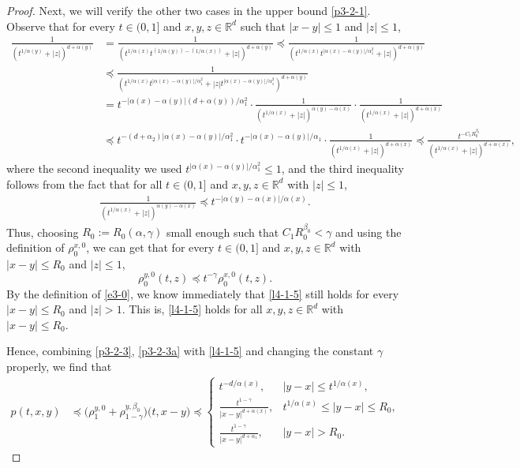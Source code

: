 \documentclass[a4paper,11pt]{amsart}
\renewcommand{\le}{\leqslant}
\newcommand{\R}{\mathds R}
\newcommand{\B}{\beta}
\newcommand{\p}{\preceq}
\newcommand{\A}{\alpha}
\newcommand{\G}{\gamma}
\theoremstyle{definition}
\begin{document}
\begin{proof}
Next, we will verify the other two cases in the upper bound \eqref{p3-2-1}. Observe that
for every $t \in (0,1]$ and $x,y,z\in \R^d$ such that
$|x-y|\le 1$ and $|z|\le 1$,
\begin{align*}
 \frac{1}{(t^{{1/\A(y)}}+|z|)^{d+\A(y)}}
&=
\frac{1}{(t^{{1/\A(x)}}t^{({1/\A(y)})-({1/\A(x)})}+|z|)^{d+\A(y)}}
 \p \frac{1}{(t^{{1/\A(x)}}t^{{|\A(x)-\A(y)|}/{\A_1^2}}+|z|)^{d+\A(y)}}\\
&\p \frac{1}{(t^{{1/\A(x)}}t^{{|\A(x)-\A(y)|}/{\A_1^2}}+|z|t^{{|\A(x)-\A(y)|}/{\A_1^2}})^{d+\A(y)}}\\
&=t^{-{|\A(x)-\A(y)|(d+\A(y))}/{\A_1^2}}\cdot\frac{1}{(t^{{1/\A(x)}}+|z|)^{\A(y)-\A(x)}}\cdot
\frac{1}{(t^{{1/\A(x)}}+|z|)^{d+\A(x)}}\\
&\p t^{-{(d+\A_2)|\A(x)-\A(y)|}/{\A_1^2}}\cdot
t^{-{|\A(x)-\A(y)|}/{\A_1}}\cdot
\frac{1}{(t^{{1/\A(x)}}+|z|)^{d+\A(x)}} \p
\frac{t^{-C_1R_0^{\B_0}}}{(t^{{1/\A(x)}}+|z|)^{d+\A(x)}},
\end{align*}
where the second inequality we used
$t^{{|\A(x)-\A(y)|}/{\A_1^2}}\le 1$, and the third inequality follows from the fact that for all $t\in (0,1]$ and $x,y,z\in \R^d$ with $|z|\le 1$,
\begin{align*}
\frac{1}{(t^{{1/\A(x)}}+|z|)^{\A(y)-\A(x)}}\p t^{-{|\A(y)-\A(x)|}/{\A(x)}}.
\end{align*}
Thus, choosing $R_0:=R_0(\A,\G)$ small enough  such that
$C_1R_0^{\B_0}<\G$ and using the definition of $\rho^{x,0}_0$, we can
get that for every $t \in (0,1]$ and $x,y,z\in \R^d$ with
$|x-y|\le R_0$ and $|z|\le 1$,
\begin{equation}\label{l4-1-5}
\rho^{y,0}_0(t,z)\p t^{-\G}\rho^{x,0}_0(t,z).
\end{equation}
By the definition of \eqref{e3-0}, we know immediately that \eqref{l4-1-5} still holds for
every $|x-y|\le R_0$ and $|z|> 1$. This is, \eqref{l4-1-5} holds for all $x,y,z\in \R^d$ with $|x-y|\le R_0$.

Hence, combining \eqref{p3-2-3}, \eqref{p3-2-3a} with \eqref{l4-1-5} and changing the constant $\G$ properly, we find that
\begin{align*}
p(t,x,y)&\p
 \big(\rho^{y,0}_{1}+\rho^{y,\B_0}_{1-\gamma}
\big)\big(t,x-y\big)\p \begin{cases}t^{-{d/\A(x)}}, & |y-x|\le t^{{1/\A(x)}},\\
\frac{t^{1-\G}}{|x-y|^{d+\A(x)}},& t^{{1/\A(x)}}\le |y-x|\le R_0,\\
\frac{t^{1-\gamma}}{|x-y|^{d+\A_1}},&|y-x|> R_0.
\end{cases}
\end{align*}


\end{proof}
\end{document}
